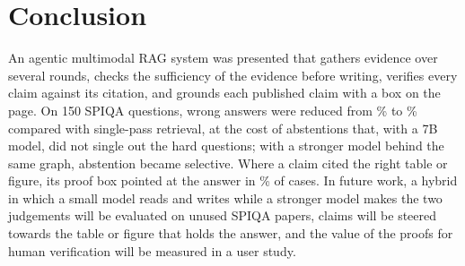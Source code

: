 \section{Conclusion}
\label{sec:conclusion}

An agentic multimodal RAG system was presented that gathers evidence over several
rounds, checks the sufficiency of the evidence before writing, verifies every claim
against its citation, and grounds each published claim with a box on the page. On 150
SPIQA questions, wrong answers were reduced from \nSPWrong\% to \nFullWrong\% compared
with single-pass retrieval, at the cost of abstentions that, with a 7B model, did not
single out the hard questions; with a stronger model behind the same graph, abstention
became selective. Where a claim cited the right table or figure, its proof box pointed
at the answer in \nProofInsideFull\% of cases. In future work, a hybrid in which a small
model reads and writes while a stronger model makes the two judgements will be
evaluated on unused SPIQA papers, claims will be steered towards the table or figure
that holds the answer, and the value of the proofs for human verification will be
measured in a user study.
